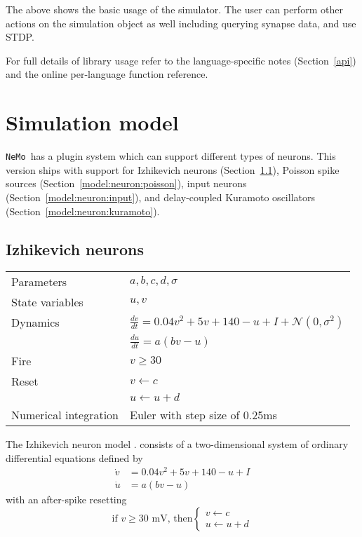 \documentclass[a4paper]{article}
\newcommand{\nemo}{\texttt{NeMo}}
\begin{document}
The above shows the basic usage of the simulator.
The user can perform other actions on the simulation object as well
	including querying synapse data,
	and use STDP.

For full details of library usage refer to the language-specific notes (Section~\ref{api})
and the online per-language function reference.

\section{Simulation model}
\label{model}

\nemo\ has a plugin system which can support different types of neurons.
This version ships with support for 
	Izhikevich neurons (Section~\ref{model:neuron:izhikevich}),
	Poisson spike sources (Section~\ref{model:neuron:poisson}),
	input neurons (Section~\ref{model:neuron:input}), and
	delay-coupled Kuramoto oscillators (Section~\ref{model:neuron:kuramoto}).

\subsection{Izhikevich neurons}
\label{model:neuron:izhikevich}

\begin{tabular}{ll}
Parameters      & $a, b, c, d, \sigma$                 \\
State variables & $u, v$                               \\
Dynamics        & $\frac{dv}{dt} = 0.04v^2+5v+140-u+I + \mathcal{N}(0,\sigma^2)$ \\
                & $\frac{du}{dt} = a(bv-u)$            \\
Fire            & $v \ge 30$                           \\
Reset           & $v\leftarrow c$                      \\
                & $u\leftarrow u+d$                    \\
Numerical integration & Euler with step size of 0.25ms \\
\end{tabular}

The Izhikevich neuron model 
\cite{izhikevich2003simple_model}.
consists of a two-dimensional system of ordinary differential equations defined by
\begin{align}
	\dot{v} & = 0.04v^2+5v+140-u+I    \label{eq:update_v} \\
	\dot{u} & = a(bv-u)               \label{eq:update_u}
\end{align}
with an after-spike resetting
\begin{equation}
\label{eq:reset}
\text{if }v\ge30\text{ mV, then}\begin{cases}v\leftarrow c\\u\leftarrow u+d\end{cases}
\end{equation}
\end{document}
